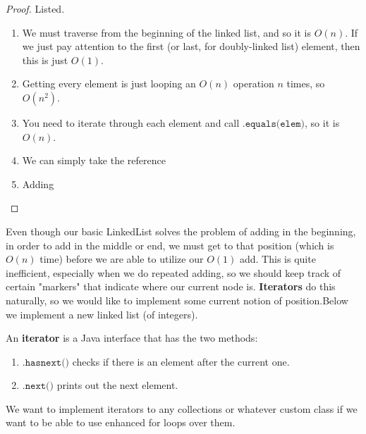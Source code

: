 \documentclass{article}
\begin{document}
    \begin{proof}
    Listed. 
    \begin{enumerate}
        \item We must traverse from the beginning of the linked list, and so it is $O(n)$. If we just pay attention to the first (or last, for doubly-linked list) element, then this is just $O(1)$. 
        \item Getting every element is just looping an $O(n)$ operation $n$ times, so $O(n^2)$. 
        \item You need to iterate through each element and call $\texttt{.equals(elem)}$, so it is $O(n)$. 
        \item We can simply take the reference 
        \item Adding 
    \end{enumerate}
    \end{proof}

    Even though our basic LinkedList solves the problem of adding in the beginning, in order to add in the middle or end, we must get to that position (which is $O(n)$ time) before we are able to utilize our $O(1)$ add. This is quite inefficient, especially when we do repeated adding, so we should keep track of certain "markers" that indicate where our current node is. \textbf{Iterators} do this naturally, so we would like to implement some current notion of position.Below we implement a new linked list (of integers). 

    \begin{definition}[Iterator]
    An \textbf{iterator} is a Java interface that has the two methods: 
    \begin{enumerate}
        \item $\texttt{.hasnext()}$ checks if there is an element after the current one. 
        \item $\texttt{.next()}$ prints out the next element. 
    \end{enumerate}
    We want to implement iterators to any collections or whatever custom class if we want to be able to use enhanced for loops over them. 
    \end{definition}
\end{document}

